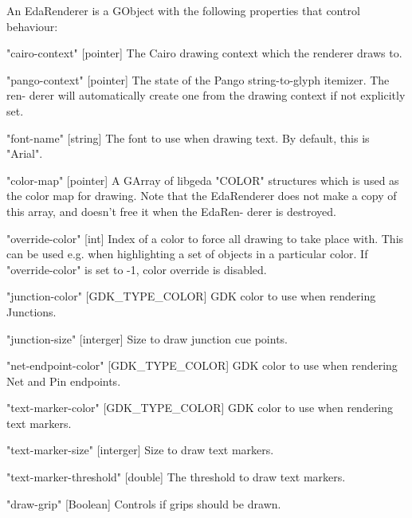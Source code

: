               An  EdaRenderer  is a GObject with the following properties that
              control behaviour:

                "cairo-context"  [pointer]
                    The Cairo drawing context which the renderer draws to.

                "pango-context"  [pointer]
                    The state of the Pango string-to-glyph itemizer. The  ren-
              derer
                    will  automatically create one from the drawing context if
              not
                    explicitly set.

                "font-name"  [string]
                    The font to use when drawing text.  By  default,  this  is
              "Arial".

                "color-map"  [pointer]
                    A  GArray  of  libgeda "COLOR" structures which is used as
              the
                    color map for drawing. Note that the EdaRenderer does  not
              make
                    a copy of this array, and doesn't free it when the EdaRen-
              derer
                    is destroyed.

                "override-color"  [int]
                    Index of a color to force all drawing to take place  with.
              This
                    can  be  used e.g. when highlighting a set of objects in a
              particular
                    color. If "override-color" is set to -1, color override is
              disabled.

                "junction-color"  [GDK_TYPE_COLOR]
                    GDK color to use when rendering Junctions.

                "junction-size"  [interger]
                    Size to draw junction cue points.

                "net-endpoint-color"  [GDK_TYPE_COLOR]
                    GDK color to use when rendering Net and Pin endpoints.

                "text-marker-color"  [GDK_TYPE_COLOR]
                    GDK color to use when rendering text markers.

                "text-marker-size"  [interger]
                    Size to draw text markers.

                "text-marker-threshold"  [double]
                    The threshold to draw text markers.

                "draw-grip"  [Boolean]
                    Controls if grips should be drawn.

